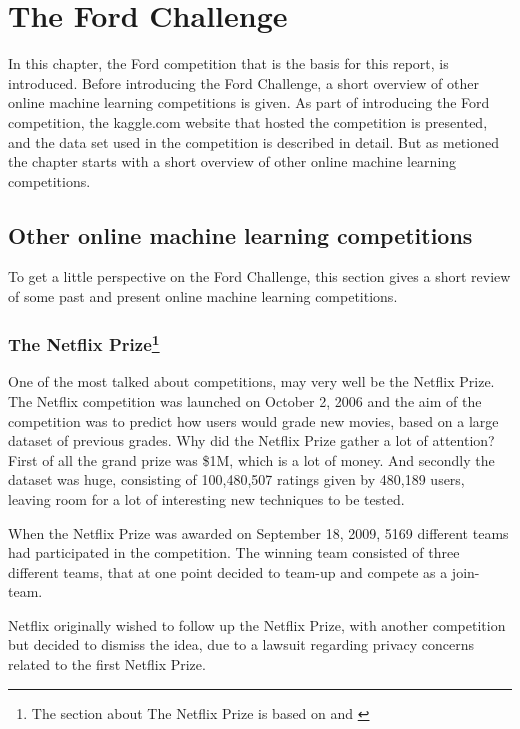 \chapter{The Ford Challenge} 
In this chapter, the Ford competition that is the basis for this report, is introduced. Before introducing the Ford Challenge, a short overview of other online machine learning competitions is given. As part of introducing the Ford competition, the kaggle.com website that hosted the competition is presented, and the data set used in the competition is described in detail. But as metioned the chapter starts with a short overview of other online machine learning competitions.

\section{Other online machine learning competitions}
To get a little perspective on the Ford Challenge, this section gives a short review of some past and present online machine learning competitions.

\subsection[The Netflix Prize]{The Netflix Prize\protect\footnote{The section about The Netflix Prize is based on \citet{wiki:netflix_prize} and \citet{netflix_leaderboard}}}
One of the most talked about competitions, may very well be the Netflix Prize. The Netflix competition was launched on October 2, 2006 and the aim of the competition was to predict how users would grade new movies, based on a large dataset of previous grades. Why did the Netflix Prize gather a lot of attention? First of all the grand prize was \$1M, which is a lot of money. And secondly the dataset was huge, consisting of 100,480,507 ratings given by 480,189 users, leaving room for a lot of interesting new techniques to be tested. \par 
When the Netflix Prize was awarded on September 18, 2009, 5169 different teams had participated in the competition. The winning team consisted of three different teams, that at one point decided to team-up and compete as a join-team.\par 
Netflix originally wished to follow up the Netflix Prize, with another competition but decided to dismiss the idea, due to a lawsuit regarding privacy concerns related to the first Netflix Prize.

